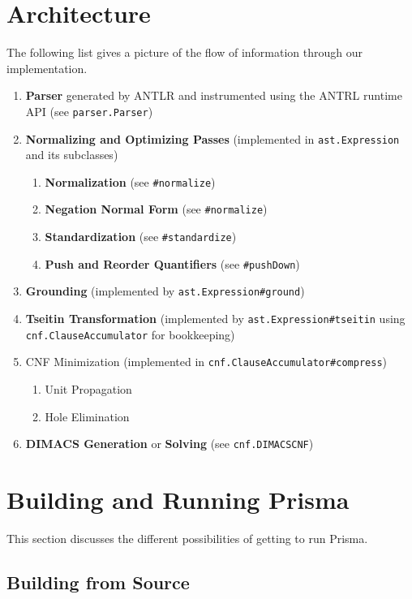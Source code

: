 \documentclass{llncs}
\begin{document}
\section{Architecture}
\label{sec:arch}

The following list gives a picture of the flow of information through our implementation.

\begin{enumerate}
	\item{\textbf{Parser} generated by ANTLR and instrumented using the ANTRL runtime API (see \texttt{parser.Parser})}
	\item{\textbf{Normalizing and Optimizing Passes} (implemented in \texttt{ast.Expression} and its subclasses)
		\begin{enumerate}
			\item{\textbf{Normalization} (see \texttt{\#normalize})}
			\item{\textbf{Negation Normal Form} (see \texttt{\#normalize})}
			\item{\textbf{Standardization} (see \texttt{\#standardize})}
			\item{\textbf{Push and Reorder Quantifiers} (see \texttt{\#pushDown})}
		\end{enumerate}
	}
	\item{\textbf{Grounding} (implemented by \texttt{ast.Expression\#ground})}
	\item{\textbf{Tseitin Transformation} (implemented by \texttt{ast.Expression\#tseitin} using \texttt{cnf.ClauseAccumulator} for bookkeeping)}
	\item{CNF Minimization (implemented in \texttt{cnf.ClauseAccumulator\#compress})
		\begin{enumerate}
			\item{Unit Propagation}
			\item{Hole Elimination}
		\end{enumerate}
	}
	\item{\textbf{DIMACS Generation} or \textbf{Solving} (see \texttt{cnf.DIMACSCNF})}
\end{enumerate}

\section{Building and Running Prisma}
\label{sec:buildnrun}

This section discusses the different possibilities of getting to run Prisma.

\subsection{Building from Source}
\label{sec:build}
\end{document}
